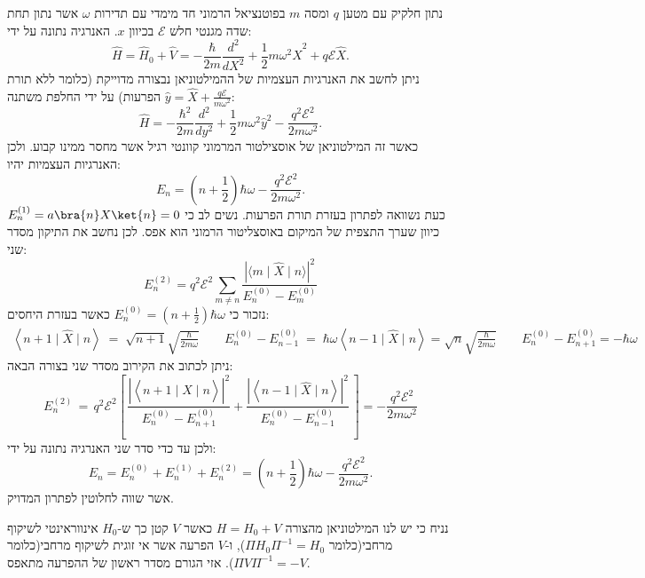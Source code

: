 \documentclass{tstextbook}
\begin{document}
\begin{example}
נתון חלקיק עם מטען \(q\) ומסה \(m\) בפוטנציאל הרמוני חד מימדי עם תדירות \(\omega\) אשר נתון תחת שדה מגנטי חלש \(\mathcal{E}\) בכיוון \(x\). האנרגיה נתונה על ידי:
$$\hat{H}=\hat{H}_{0}+\hat{V}=-\frac{\hbar}{2m}\frac{d^{2}}{d X^{2}}+\frac{1}{2}m\omega^{2}\hat{X}^{2}+q\mathcal{E}\hat{X}.$$
ניתן לחשב את האנרגיות העצמיות של ההמילטוניאן נבצורה מדוייקת (כלומר ללא תורת הפרעות) על ידי החלפת משתנה \(\hat{y}=\hat{X}+\frac{q\mathcal{E}}{m\omega^{2}}\):
$$\hat{H}=-\frac{\hbar^{2}}{2m}\frac{d^{2}}{d y^{2}}+\frac{1}{2}m\omega^{2}\hat{y}^{2}-\frac{q^{2}\mathcal{E}^{2}}{2m\omega^{2}}.$$
כאשר זה המילטוניאן של אוסצילטור המרמוני קוונטי רגיל אשר מחסר ממינו קבוע. ולכן האנרגיות העצמיות יהיו:
$$E_{n}=\left(n+\frac{1}{2}\right)\hbar\omega-\frac{q^{2}\mathcal{E}^{2}}{2m\omega^{2}}.$$
כעת נשוואה לפתרון בעזרת תורת הפרעות. נשים לב כי \(E_{n}^{(1)}=a\bra{n}X\ket{n}=0\) כיוון שערך התצפית של המיקום באוסצליטור הרמוני הוא אפס. לכן נחשב את התיקון מסדר שני:
$$E_{n}^{(2)}=q^{2}\mathcal{E}^{2}\sum_{m\neq n}\frac{\left|\langle m\mid\hat{X}\mid n\rangle\right|^{2}}{E_{n}^{(0)}-E_{m}^{(0)}}$$
נזכור כי \(E_{n}^{(0)}=\left( n+\frac{1}{2} \right)\hbar \omega\) כאשר בעזרת היחסים:
\begin{gather*}\left\langle  n+1\mid\hat{X}\mid n \right\rangle\;=\;\sqrt{n+1}\sqrt{\frac{\hbar}{2m\omega}}\qquad E_{n}^{(0)}-E_{n-1}^{(0)}\;=\;\hbar\omega\left\langle  n-1\mid\hat{X}\mid n \right\rangle=\sqrt{n}\sqrt{\frac{\hbar}{2m\omega}}\qquad E_{n}^{(0)}-E_{n+1}^{(0)}=-\hbar\omega
\end{gather*}
ניתן לכתוב את הקירוב מסדר שני בצורה הבאה:
$$E_{n}^{(2)}\,=\,q^{2}{\mathcal E}^{2}\left[\,\frac{|\left\langle  n+1\mid\hat{X}\mid n \right\rangle|^{2}}{E_{n}^{(0)}-E_{n+1}^{(0)}}+\frac{|\left\langle  n-1\mid\hat{X}\mid n \right\rangle|^{2}}{E_{n}^{(0)}-E_{n-1}^{(0)}}\,\right]=-\frac{q^{2}\mathcal{E}^{2}}{2m\omega^{2}}$$
ולכן עד כדי סדר שני האנרגיה נתונה על ידי:
$$E_{n}=E_{n}^{(0)}+E_{n}^{(1)}+E_{n}^{(2)}=\left(n+\frac{1}{2}\right)\hbar\omega-\frac{q^{2}\mathcal{E}^{2}}{2m\omega^{2}}.$$
אשר שווה לחלוטין לפתרון המדויק.

\end{example}
\begin{proposition}
נניח כי יש לנו המילטוניאן מהצורה \(H=H_{0}+V\) כאשר \(V\) קטן כך ש-\(H_{0}\) אינווראינטי לשיקוף מרחבי(כלומר \(\Pi H_{0} \Pi ^{-1}=H_{0}\)), ו-\(V\) הפרעה אשר אי זוגית לשיקוף מרחבי(כלומר \(\Pi V\Pi ^{-1}=-V\)). אזי הגורם מסדר ראשון של ההפרעה מתאפס.

\end{proposition}
\end{document}
